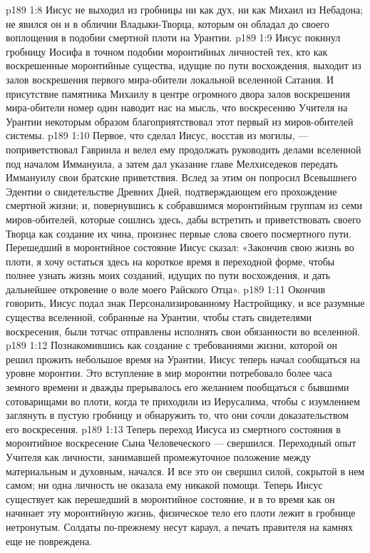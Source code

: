\vs p189 1:8 \pc {}\bibnobreakspace Иисус не выходил из гробницы ни как дух, ни как Михаил из Небадона; не явился он и в обличии Владыки\hyp{}Творца, которым он обладал до своего воплощения в подобии смертной плоти на Урантии.
\vs p189 1:9 \pc {}\bibnobreakspace Иисус покинул гробницу Иосифа в точном подобии моронтийных личностей тех, кто как воскрешенные моронтийные существа, идущие по пути восхождения, выходит из залов воскрешения первого мира\hyp{}обители локальной вселенной Сатания. И присутствие памятника Михаилу в центре огромного двора залов воскрешения мира\hyp{}обители номер один наводит нас на мысль, что воскресению Учителя на Урантии некоторым образом благоприятствовал этот первый из миров\hyp{}обителей системы.
\vs p189 1:10 \pc Первое, что сделал Иисус, восстав из могилы, --- поприветствовал Гавриила и велел ему продолжать руководить делами вселенной под началом Иммануила, а затем дал указание главе Мелхиседеков передать Иммануилу свои братские приветствия. Вслед за этим он попросил Всевышнего Эдентии о свидетельстве Древних Дней, подтверждающем его прохождение смертной жизни; и, повернувшись к собравшимся моронтийным группам из семи миров\hyp{}обителей, которые сошлись здесь, дабы встретить и приветствовать своего Творца как создание их чина, произнес первые слова своего посмертного пути. Перешедший в моронтийное состояние Иисус сказал: «Закончив свою жизнь во плоти, я хочу остаться здесь на короткое время в переходной форме, чтобы полнее узнать жизнь моих созданий, идущих по пути восхождения, и дать дальнейшее откровение о воле моего Райского Отца».
\vs p189 1:11 Окончив говорить, Иисус подал знак Персонализированному Настройщику, и все разумные существа вселенной, собранные на Урантии, чтобы стать свидетелями воскресения, были тотчас отправлены исполнять свои обязанности во вселенной.
\vs p189 1:12 Познакомившись как создание с требованиями жизни, которой он решил прожить небольшое время на Урантии, Иисус теперь начал сообщаться на уровне моронтии. Это вступление в мир моронтии потребовало более часа земного времени и дважды прерывалось его желанием пообщаться с бывшими сотоварищами во плоти, когда те приходили из Иерусалима, чтобы с изумлением заглянуть в пустую гробницу и обнаружить то, что они сочли доказательством его воскресения.
\vs p189 1:13 Теперь переход Иисуса из смертного состояния в моронтийное воскресение Сына Человеческого --- свершился. Переходный опыт Учителя как личности, занимавшей промежуточное положение между материальным и духовным, начался. И все это он свершил силой, сокрытой в нем самом; ни одна личность не оказала ему никакой помощи. Теперь Иисус существует как перешедший в моронтийное состояние, и в то время как он начинает эту моронтийную жизнь, физическое тело его плоти лежит в гробнице нетронутым. Солдаты по\hyp{}прежнему несут караул, а печать правителя на камнях еще не повреждена.
